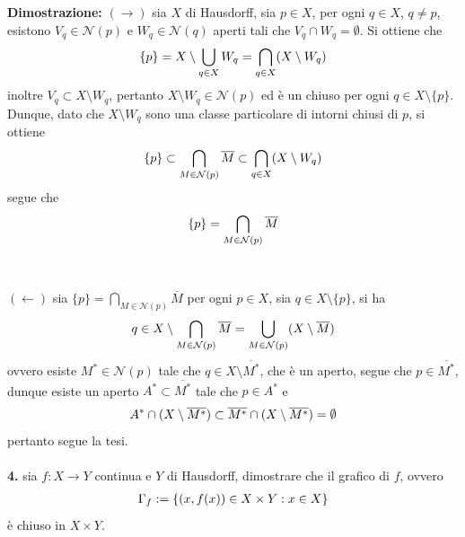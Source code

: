 \documentclass{article}
\begin{document}
\textbf{Dimostrazione:} $(\rightarrow)$ sia $X$ di Hausdorff, sia $p \in X$, per ogni $q \in X$, $q \neq p$, esistono $V_q \in \mathcal{N}(p)$ e $W_q \in \mathcal{N}(q)$ aperti tali che $V_q \cap W_q = \emptyset$. Si ottiene che
\begin{gather}
    \{ p \} = X \setminus \bigcup_{q \in X} W_q = \bigcap_{q \in X} (X \setminus W_q) \notag
\end{gather}
inoltre $V_q \subset X \setminus W_q$, pertanto $X \setminus W_q \in \mathcal{N}(p)$ ed è un chiuso per ogni $q \in X \setminus \{ p \}$. Dunque, dato che $X \setminus W_q$ sono una classe particolare di intorni chiusi di $p$, si ottiene
\begin{gather}
    \{ p \} \subset \bigcap_{M \in \mathcal{N}(p)} \overline{M} \subset \bigcap_{q \in X} (X \setminus W_q) \notag
\end{gather}
segue che
\begin{gather}
    \{ p \} = \bigcap_{M \in \mathcal{N}(p)} \overline{M} \notag
\end{gather} \\ \\
$(\leftarrow)$ sia $\{ p \} = \bigcap_{M \in \mathcal{N}(p)} \overline{M}$ per ogni $p \in X$, sia $q \in X \setminus \{ p \}$, si ha
\begin{gather}
    q \in X \setminus \bigcap_{M \in \mathcal{N}(p)} \overline{M} = \bigcup_{M \in \mathcal{N}(p)} (X \setminus \overline{M}) \notag
\end{gather}
ovvero esiste $M^* \in \mathcal{N}(p)$ tale che $q \in X \setminus \overline{M^*}$, che è un aperto, segue che $p \in \overline{M^*}$, dunque esiste un aperto $A^* \subset \overline{M^*}$ tale che $p \in A^*$ e
\begin{gather}
    A^* \cap (X \setminus \overline{M^*}) \subset \overline{M^*} \cap (X \setminus \overline{M^*}) = \emptyset \notag
\end{gather}
pertanto segue la tesi. \\ \\
\textbf{4.} sia $f : X \longrightarrow Y$ continua e $Y$ di Hausdorff, dimostrare che il grafico di $f$, ovvero
\begin{gather}
    \Gamma_f := \{ (x, f(x)) \in X \times Y : x \in X \} \notag
\end{gather}
è chiuso in $X \times Y$. \\
\end{document}
